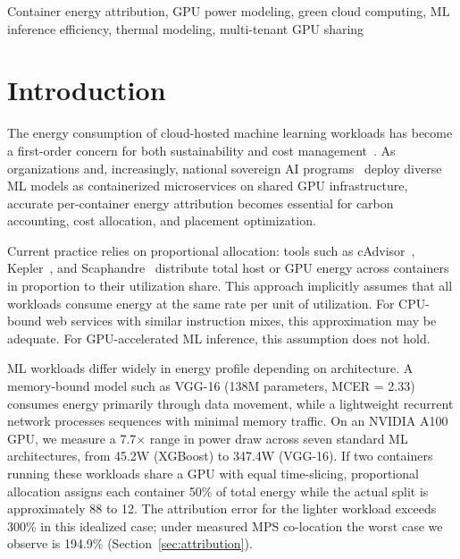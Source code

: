\documentclass[conference]{IEEEtran}
\begin{document}
\begin{IEEEkeywords}
Container energy attribution, GPU power modeling, green cloud computing, ML inference efficiency, thermal modeling, multi-tenant GPU sharing
\end{IEEEkeywords}

\section{Introduction}
\label{sec:intro}

The energy consumption of cloud-hosted machine learning workloads has become a first-order concern for both sustainability and cost management~\cite{patterson2022carbon}. As organizations and, increasingly, national sovereign AI programs~\cite{syed2026sovereign} deploy diverse ML models as containerized microservices on shared GPU infrastructure, accurate per-container energy attribution becomes essential for carbon accounting, cost allocation, and placement optimization.

Current practice relies on proportional allocation: tools such as cAdvisor~\cite{cadvisor2024}, Kepler~\cite{kepler2023}, and Scaphandre~\cite{scaphandre2023} distribute total host or GPU energy across containers in proportion to their utilization share. This approach implicitly assumes that all workloads consume energy at the same rate per unit of utilization. For CPU-bound web services with similar instruction mixes, this approximation may be adequate. For GPU-accelerated ML inference, this assumption does not hold.

ML workloads differ widely in energy profile depending on architecture. A memory-bound model such as VGG-16 (138M parameters, MCER = 2.33) consumes energy primarily through data movement, while a lightweight recurrent network processes sequences with minimal memory traffic. On an NVIDIA A100 GPU, we measure a 7.7$\times$ range in power draw across seven standard ML architectures, from 45.2W (XGBoost) to 347.4W (VGG-16). If two containers running these workloads share a GPU with equal time-slicing, proportional allocation assigns each container 50\% of total energy while the actual split is approximately 88 to 12. The attribution error for the lighter workload exceeds 300\% in this idealized case; under measured MPS co-location the worst case we observe is 194.9\% (Section~\ref{sec:attribution}).
\end{document}
